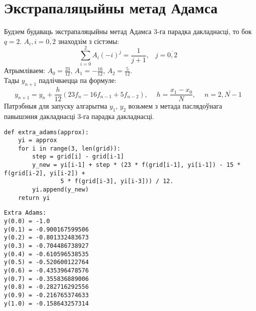 \section{Экстрапаляцыйны метад Адамса}
Будзем будаваць экстрапаляцыйны метад Адамса 3-га парадка дакладнасці, то бок $q=2$. $A_i, i = \overline{0, 2}$ знаходзім з сістэмы:
\begin{equation}
    \sum _{i = 0}^{2} A_i (-i)^j = \frac{1}{j+1} , \hspace{10pt} j = \overline{0,2}
\end{equation}
Атрымліваем: $A_0 = \frac{23}{12}$, $A_1 = -\frac{16}{12}$, $A_2 = \frac{5}{12}$.\\
Тады $y_{n+1}$ падлічваецца па формуле:
\begin{equation}
    y_{n+1} = y_n + \frac{h}{12}(23f_n - 16f_{n-1} + 5f_{n-2}), \hspace{15pt} h = \frac{x_1 - x_0}{N},\hspace{15pt} n = \overline{2, N-1}
\end{equation}
Патрэбныя для запуску алгарытма $y_1$, $y_2$ возьмем з метада паслядоўнага павышэння дакладнасці 3-га парадка дакладнасці.

{\small
\begin{verbatim}
def extra_adams(approx):
    yi = approx
    for i in range(3, len(grid)):
        step = grid[i] - grid[i-1]
        y_new = yi[i-1] + step * (23 * f(grid[i-1], yi[i-1]) - 15 * f(grid[i-2], yi[i-2]) +
                5 * f(grid[i-3], yi[i-3])) / 12.
        yi.append(y_new)
    return yi
\end{verbatim}
}

{\small
\begin{verbatim}
Extra Adams:
y(0.0) = -1.0
y(0.1) = -0.900167599506
y(0.2) = -0.801332483673
y(0.3) = -0.704486738927
y(0.4) = -0.610596538535
y(0.5) = -0.520600122764
y(0.6) = -0.435396478576
y(0.7) = -0.355836889006
y(0.8) = -0.282716292556
y(0.9) = -0.216765374633
y(1.0) = -0.158643257314
\end{verbatim}
}
